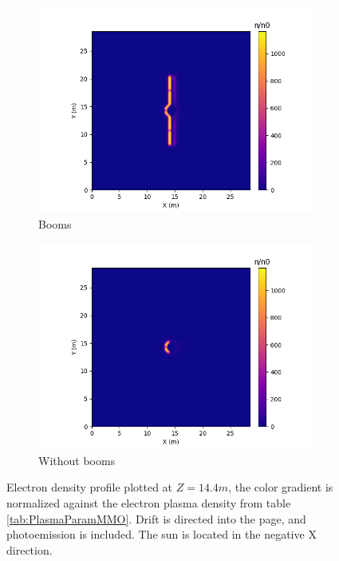 \begin{figure}[H]
  \begin{subfigure}[b]{0.6\textwidth}
  \includegraphics[width=\textwidth]{figures/MMO/minZ/WB/E_minZ_WB.png}
  \caption{Booms}
  \label{fig:E_minZ_WB}
\end{subfigure}
\begin{subfigure}[b]{0.6\textwidth}
  \includegraphics[width=\textwidth]{figures/MMO/minZ/NB/E_minZ_NB.png}
  \caption{Without booms}
  \label{fig:E_minZ_NB}
\end{subfigure}
\caption{Electron density profile plotted at $Z = 14.4 m$, the color gradient is normalized against the electron plasma density from table \ref{tab:PlasmaParamMMO}. Drift is directed into the page, and photoemission is included. The sun is located in the negative X direction.}
\label{fig:Electron_minZ}
\end{figure}

